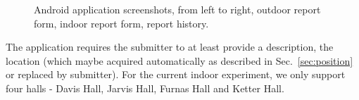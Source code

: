 \documentclass{acm_proc_article-sp}
\begin{document}
\begin{figure}[!t]
 \caption{Android application screenshots, from left to right, outdoor report form, indoor report form, report history.} \label{fig:form}
 \end{figure}
 The application requires the submitter to at least provide a description, the location (which maybe acquired automatically as described in 
 Sec.~\ref{sec:position} or replaced by submitter). For the current indoor experiment, we only support four halls - Davis Hall, Jarvis Hall, 
 Furnas Hall and Ketter Hall.
\end{document}
